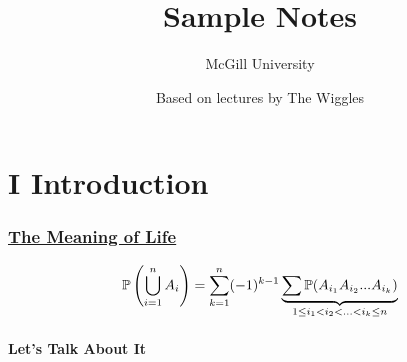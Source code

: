 \documentclass[toc]{lecturenew}
\title{Sample Notes}
\subtitle{M\footnotesize c\normalsize Gill University}
\author{Based on lectures by The Wiggles}
\begin{document}
	\newpage
	\part{I \quad Introduction}
	\renewcommand\partcontent{Introduction}
	\setcounter{page}{3}
	\section{\underline{The Meaning of Life}}
	$$\P\left(\bigcup_{i=1}^nA_i\right) = \sum_{k=1}^{n} (-1)^{k-1}\underbrace{\sum\P(A_{i_1}A_{i_2} ...A_{i_k})}_{1 \leq i_1 < i_2 < ... < i_k \leq n}$$
	\subsection{Let's Talk About It}
\end{document}

